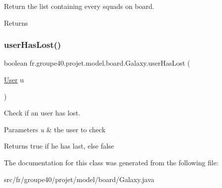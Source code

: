 Return the list containing every squads on board. 

\begin{DoxyReturn}{Returns}

\end{DoxyReturn}
\mbox{\label{classfr_1_1groupe40_1_1projet_1_1model_1_1board_1_1_galaxy_ad3ec27b73e7f093df14ca096395d10c2}} 
\subsubsection{\texorpdfstring{user\+Has\+Lost()}{userHasLost()}}
{\footnotesize\ttfamily boolean fr.\+groupe40.\+projet.\+model.\+board.\+Galaxy.\+user\+Has\+Lost (\begin{DoxyParamCaption}\item[{\hyperlink{classfr_1_1groupe40_1_1projet_1_1client_1_1_user}{User}}]{u }\end{DoxyParamCaption})}



Check if an user has lost. 


\begin{DoxyParams}{Parameters}
{\em u} & the user to check \\
\hline
\end{DoxyParams}
\begin{DoxyReturn}{Returns}
true if he has last, else false 
\end{DoxyReturn}


The documentation for this class was generated from the following file\+:\begin{DoxyCompactItemize}
\item 
src/fr/groupe40/projet/model/board/Galaxy.\+java\end{DoxyCompactItemize}
